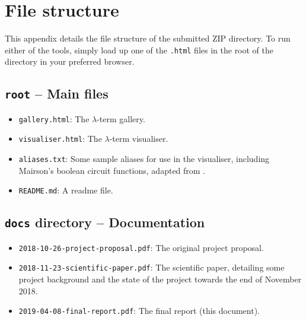 \documentclass[11pt]{article}
\begin{document}
\newpage
\appendix

\section{File structure}
\label{sec:file-structure}
This appendix details the file structure of the submitted ZIP directory. To run either of the tools, simply load up one of the \texttt{.html} files in the root of the directory in your preferred browser.

\subsection{\texttt{root} -- Main files}
\begin{itemize}
    \item \texttt{gallery.html}: The $\lambda$-term gallery.
    \item \texttt{visualiser.html}: The $\lambda$-term visualiser.
    \item \texttt{aliases.txt}: Some sample aliases for use in the visualiser, including Mairson's boolean circuit functions, adapted from \cite{mairson}.
    \item \texttt{README.md}: A readme file.
\end{itemize}

\subsection{\texttt{docs} directory -- Documentation}
\begin{itemize}
    \item \texttt{2018-10-26-project-proposal.pdf}: The original project proposal.
    \item \texttt{2018-11-23-scientific-paper.pdf}: The scientific paper, detailing some project background and the state of the project towards the end of November 2018.
    \item \texttt{2019-04-08-final-report.pdf}: The final report (this document).
\end{itemize}
\end{document}
